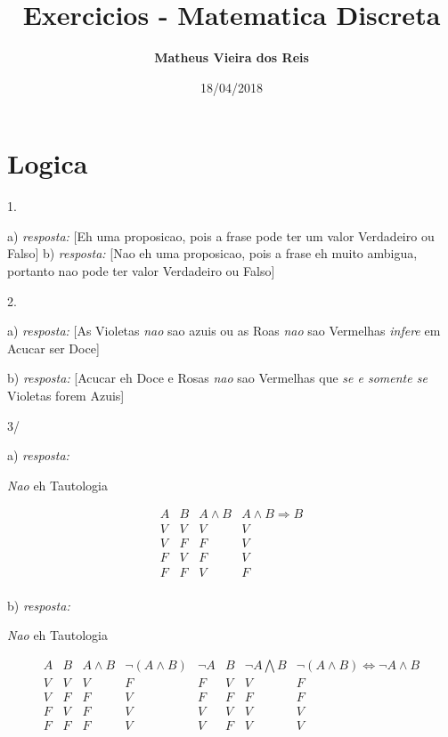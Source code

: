 \documentclass[a4paper, 12pt]{article}
\begin{document}
	\title{Exercicios - Matematica Discreta}
	\author{\textbf{Matheus Vieira dos Reis}}
	\date{18/04/2018}
	\maketitle
	\parindent=0in
	
	\section{Logica}
	\parskip=4pt 1.
	\par
	\parskip=8pt a) \emph {resposta:} [Eh uma proposicao, pois a frase pode ter um valor Verdadeiro ou Falso]
	\parskip=8pt b) \emph {resposta:} [Nao eh uma proposicao, pois a frase eh muito ambigua, portanto nao pode ter valor Verdadeiro ou Falso]
	\par
	\parskip=4pt 2.
	\par
	\parskip=8pt a) \emph {resposta:} [As Violetas \emph{nao} sao azuis ou as Roas \emph{nao} sao Vermelhas \emph{infere} em Acucar ser Doce]
	\par
	\parskip=8pt b) \emph {resposta:} [Acucar eh Doce e Rosas \emph{nao} sao Vermelhas que \emph{se e somente se} Violetas forem Azuis]
	\par
	\parskip=4pt 3/
	\par
	a) \emph{resposta:}
	\begin{center} \emph{Nao} eh Tautologia \end{center}
	
	\begin{center}
	\begin{displaymath}
	\begin{array}{|c|c|c||c|}
	A & B & A \wedge B & A \wedge B\Longrightarrow B\\
	\hline
	V & V & V & V\\
	V & F & F & V\\
	F & V & F & V\\
	F & F & V & F\\
	\end{array}
	\end{displaymath}
	\end{center}
	
	\pagebreak
	b) \emph{resposta:}
	\begin{center} \emph{Nao} eh Tautologia \end{center}
	
	\begin{center}
	\begin{displaymath}
	\begin{array}{|c|c|c|c|c|c|c|c|}
	A & B & A \wedge B & \neg(A \wedge B) & \neg A & B & \neg A \bigwedge B & \neg (A \wedge B) \Longleftrightarrow \neg A \wedge B\\
	\hline
	V & V & V & F & F & V & V & F\\
	V & F & F & V & F & F & F & F\\
	F & V & F & V & V & V & V & V\\
	F & F & F & V & V & F & V & V\\
	\end{array}
	\end{displaymath}	
	\end{center}
	
\end{document}
